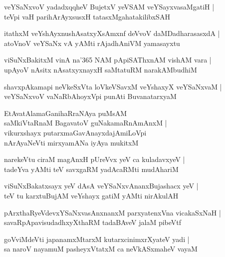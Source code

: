 \documentclass[twoside,12pt,openright]{book}
\newcounter{shloka}[chapter]
\begin{document}
\begin{shloka}
veYSaNxvoV yadadxqqheV BujetxV yeVSAM veYSayxvasaMgatiH |\\
teVpi vaH parihArAyxsusxH tatasxMgahatakilibxSAH 
\end{shloka}

\begin{shloka}
itathxM veYshAyxnushAsatxyXsAmxnf deVvoV daMDadharasasxdA |\\
atoVnoV veYSaNx vA yAMti rAjadhAniVM yamasayxtu 
\end{shloka}

\begin{shloka}
viSuNxBakitxM vinA na\char'365 NAM pApiSAThxnAM vishAM vara |\\
upAyoV nAsitx nAsatxyxnayxH saMtatuRM narakAMbudhiM 
\end{shloka}

\begin{shloka}
shavxpAkamapi neVkeSxVta loVkeVSavxM veYshaxyX veYSaNxvaM |\\
veYSaNxvoV vaNaRbAhoyxVpi punAti BuvanatarxyaM 
\end{shloka}

\begin{shloka}
EtAvatAlamaGanihaRraNAya puMsAM \\
saMkiVtaRnaM BagavatoV guNakamaRnAmAnxM |\\
vikurxshayx putarxmaGavAnayxdajAmiLoVpi \\
nArAyaNeVti mirxyamANa iyAya mukitxM 
\end{shloka}

\begin{shloka}
narekeVtu ciraM magAnxH pUreVvx yeV ca kuladavxyeV |\\
tadeYva yAMti teV savxgaRM yadAcaRMti mudAhariM 
\end{shloka}

\begin{shloka}
viSuNxBakatxsayx yeV dAsA veYSaNxvAnanxBujashacx yeV |\\
teV tu karxtuBujAM veYshayx gatiM yAMti nirAkulAH 
\end{shloka}

\begin{shloka}
pArxthaRyeVdevxYSaNxvasAnxnanxM parxyatenxVna vicakaSxNaH |\\
savaRpApavisudadhxyXthaRM tadaBAveV jalaM pibeVtf 
\end{shloka}

\begin{shloka}
goVviMdeVti japanamxMtarxM kutarxcinimxrXyateV yadi |\\
sa naroV nayamuM pasheyxVtatxM ca neVkASxmaheV vayaM 
\end{shloka}
\end{document}
